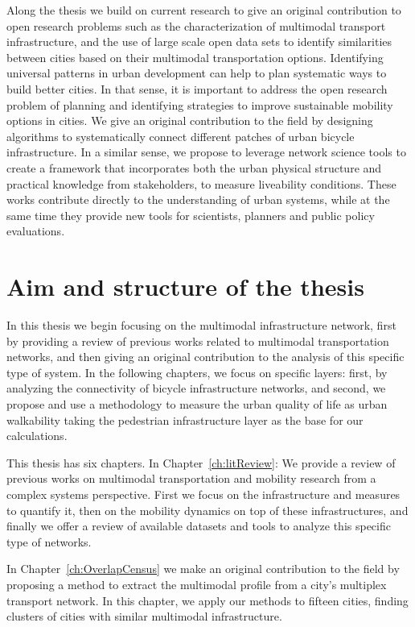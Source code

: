 Along the thesis we build on current research to give an original contribution to open research problems such as the characterization of multimodal transport infrastructure, and the use of large scale open data sets to identify similarities between cities based on their multimodal transportation options. Identifying universal patterns in urban development can help to plan systematic ways to build better cities. In that sense, it is important to address the open research problem of planning and identifying strategies to improve sustainable mobility options in cities. We give an original contribution to the field by designing algorithms to systematically connect different patches of urban bicycle infrastructure. In a similar sense, we propose to leverage network science tools to create a framework that incorporates both the urban physical structure and practical knowledge from stakeholders, to measure liveability conditions. These works contribute directly to the understanding of urban systems, while at the same time they provide new tools for scientists, planners and public policy evaluations.

\section{Aim and structure of the thesis}

In this thesis we begin focusing on the multimodal infrastructure network, first by providing a review of previous works related to multimodal transportation networks, and then giving an original contribution to the analysis of this specific type of system. In the following chapters, we focus on specific layers: first, by analyzing the connectivity of bicycle infrastructure networks, and second, we propose and use a methodology to measure the urban quality of life as urban walkability taking the pedestrian infrastructure layer as the base for our calculations.

This thesis has six chapters. In Chapter~\ref{ch:litReview}: We provide a review of previous works on multimodal transportation and mobility research from a complex systems perspective. First we focus on the infrastructure and measures to quantify it, then on the mobility dynamics on top of these infrastructures, and finally we offer a review of available datasets and tools to analyze this specific type of networks.

In Chapter~\ref{ch:OverlapCensus} we make an original contribution to the field by proposing a method to extract the multimodal profile from a city's multiplex transport network. In this chapter, we apply our methods to fifteen cities, finding clusters of cities with similar multimodal infrastructure.

